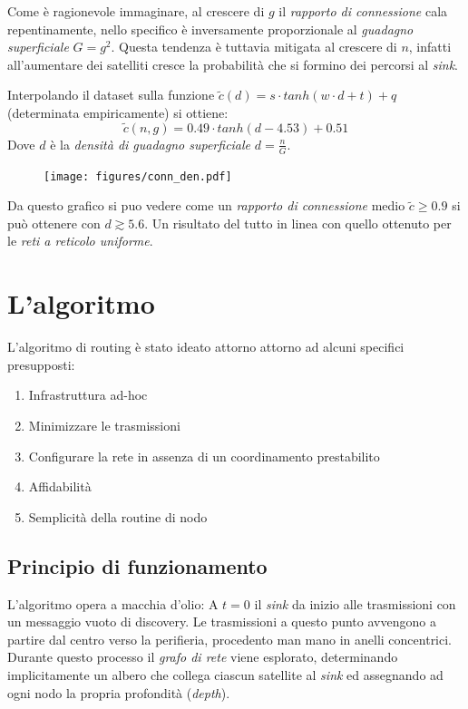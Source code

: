 \documentclass[a4paper,12pt]{article}
\theoremstyle{definition}
\begin{document}
Come è ragionevole immaginare, al crescere di $g$ il \emph{rapporto di connessione} cala repentinamente, nello specifico è inversamente proporzionale al \emph{guadagno superficiale} $G = g^2$. Questa tendenza è tuttavia mitigata al crescere di $n$, infatti all'aumentare dei satelliti cresce la probabilità che si formino dei percorsi al \emph{sink}.

Interpolando il dataset sulla funzione $\tilde{c}(d) = s \cdot tanh(w \cdot d + t) + q$ (determinata empiricamente) si ottiene:
\begin{equation*}
\tilde{c}(n, g) = 0.49 \cdot tanh(d - 4.53) + 0.51
\end{equation*}
Dove $d$ è la \emph{densità di guadagno superficiale} $d = \frac{n}{G}$.

\begin{figure}[H]
\centering
\texttt{[image: figures/conn\_den.pdf]}
\caption{}
\end{figure}

Da questo grafico si puo vedere come un \emph{rapporto di connessione} medio $\tilde{c} \geq 0.9$ si può ottenere con $d \gtrsim 5.6$. Un risultato del tutto in linea con quello ottenuto per le \emph{reti a reticolo uniforme}.

\section{L'algoritmo}

L'algoritmo di routing è stato ideato attorno attorno ad alcuni specifici presupposti:

\begin{enumerate}
\item Infrastruttura ad-hoc
\item Minimizzare le trasmissioni
\item Configurare la rete in assenza di un coordinamento prestabilito
\item Affidabilità
\item Semplicità della routine di nodo
\end{enumerate}

\subsection{Principio di funzionamento}

L'algoritmo opera a macchia d'olio: A $t=0$ il \emph{sink} da inizio alle trasmissioni con un messaggio vuoto di discovery. Le trasmissioni a questo punto avvengono a partire dal centro verso la perifieria, procedento man mano in anelli concentrici. Durante questo processo il \emph{grafo di rete} viene esplorato, determinando implicitamente un albero che collega ciascun satellite al \emph{sink} ed assegnando ad ogni nodo la propria profondità (\emph{depth}).
\end{document}
